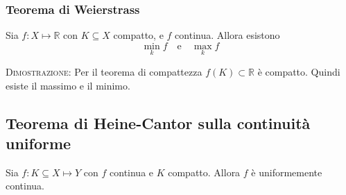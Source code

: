 \documentclass[a4paper]{extarticle}
\begin{document}
\vspace{1em}
\noindent
\subsubsection{Teorema di Weierstrass}
Sia $f : X \longmapsto \mathbb{R}$ con $K \subseteq X$ compatto, e $f$ continua. Allora esistono
\[\underset{k}{\min} f \hspace{1em} \text{e} \hspace{1em} \underset{k}{\max} f\]

\vspace{2em}
\noindent
\normalfont \normalsize
\textsc{Dimostrazione}: Per il teorema di compattezza $f(K) \subset \mathbb{R}$ è compatto. Quindi esiste il massimo e il minimo.

\vspace{1em}
\noindent
\subsection{Teorema di Heine-Cantor sulla continuità uniforme}
Sia $f : K \subseteq X \longmapsto Y$ con $f$ continua e $K$ compatto. Allora $f$ è uniformemente continua.
\end{document}

